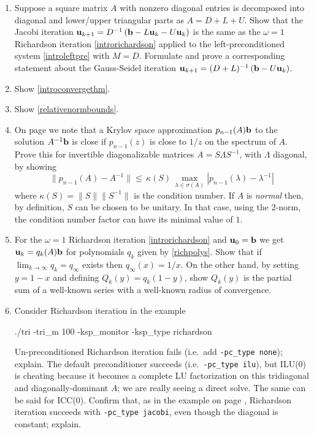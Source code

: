 \renewcommand{\labelenumi}{\arabic{chapter}.\arabic{enumi}\quad}
\begin{enumerate}
\item Suppose a square matrix $A$ with nonzero diagonal entries is decomposed into diagonal and lower/upper triangular parts as $A=D+L+U$.  Show that the Jacobi iteration $\mathbf{u}_{k+1} = D^{-1} \left(\mathbf{b} - L \mathbf{u}_k - U \mathbf{u}_k\right)$ is the same as the $\omega=1$ Richardson iteration \eqref{introrichardson} applied to the left-preconditioned system \eqref{introleftpre} with $M=D$.  Formulate and prove a corresponding statement about the Gauss-Seidel iteration $\mathbf{u}_{k+1} = (D+L)^{-1} \left(\mathbf{b} - U \mathbf{u}_k\right)$.

\item Show \eqref{introconvergethm}.

\item Show \eqref{relativenormbounds}.

\item On page \pageref{krylovgoal} we note that a Krylov space approximation $p_{n-1}(A)\mathbf{b}$ to the solution $A^{-1}\mathbf{b}$ is close if $p_{n-1}(z)$ is close to $1/z$ on the spectrum of $A$.  Prove this for invertible diagonalizable matrices $A=S\Lambda S^{-1}$, with $\Lambda$ diagonal, by showing
	$$\|p_{n-1}(A) - A^{-1}\| \le \,\kappa(S)\, \max_{\lambda \in \sigma(A)} |p_{n-1}(\lambda) - \lambda^{-1}|$$
where $\kappa(S) = \|S\| \|S^{-1}\|$ is the condition number.  If $A$ is \emph{normal} then, by definition, $S$ can be chosen to be unitary.  In that case, using the $2$-norm, the condition number factor can have its minimal value of $1$.

\item For the $\omega=1$ Richardson iteration \eqref{introrichardson} and $\mathbf{u}_0=\mathbf{b}$ we get $\mathbf{u}_k = q_k(A) \mathbf{b}$ for polynomials $q_k$ given by \eqref{richpolys}.  Show that if $\lim_{k\to\infty} q_k=q_\infty$ exists then $q_\infty(x)=1/x$.  On the other hand, by setting $y=1-x$ and defining $Q_k(y)=q_k(1-y)$, show $Q_k(y)$ is the partial sum of a well-known series with a well-known radius of convergence.

\item Consider Richardson iteration in the example
\begin{cline}
./tri -tri_m 100 -ksp_monitor -ksp_type richardson
\end{cline}
Un-preconditioned Richardson iteration fails (i.e.~add \texttt{-pc\_type none}); explain.  The default preconditioner succeeds (i.e.~\texttt{-pc\_type ilu}), but ILU($0$) is cheating because it becomes a complete LU factorization on this tridiagonal and diagonally-dominant $A$; we are really seeing a direct solve.  The same can be said for ICC($0$).  Confirm that, as in the example on page \pageref{introprerichardson}, Richardson iteration succeeds with \texttt{-pc\_type jacobi}, even though the diagonal is constant; explain.


\end{enumerate}
